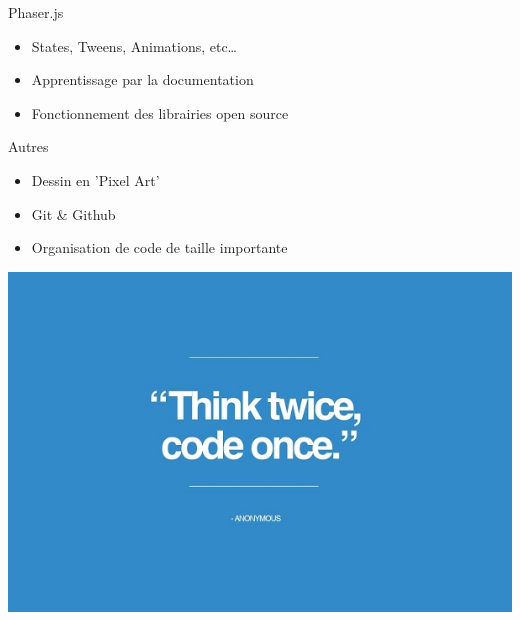 \documentclass[11pt]{beamer}
\newcommand{\pauseditemize}{\pause \begin{itemize}[<+->]}
\begin{document}
\begin{frame}{Phaser.js}

\pauseditemize
	\item States, Tweens, Animations, etc\dots
	\item Apprentissage par la documentation
	\item Fonctionnement des librairies open source
\end{itemize}

\end{frame}

	


\begin{frame}{Autres}

\pauseditemize
	\item Dessin en 'Pixel Art'
	\item Git \& Github
	\item Organisation de code de taille importante
\end{itemize}

\pause
\begin{center}
	\includegraphics[scale=.3]{../images/Think-Twice-Code-Once}
\end{center}

\end{frame}
\end{document}
